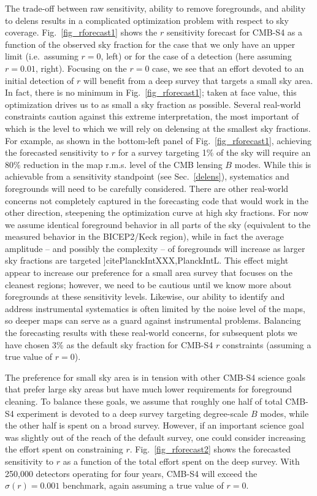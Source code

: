 The trade-off between raw sensitivity, ability to remove foregrounds, and ability to delens results in a complicated optimization problem with respect to sky coverage.
Fig.~\ref{fig_rforecast1} shows the $r$ sensitivity forecast for CMB-S4 as a function of the observed sky fraction for the case that we only have an upper limit (i.e.\ assuming $r=0$, left) or for the case of a detection (here assuming $r=0.01$, right).
Focusing on the $r=0$ case, we see that an effort devoted to an initial detection of $r$ will benefit from a deep survey that targets a small sky area.
In fact, there is no minimum in Fig.~\ref{fig_rforecast1}; taken at face value, this optimization drives us to as small a sky fraction as possible. 
Several real-world constraints caution against this extreme interpretation, the most important of which is the level to which we will rely on delensing at the smallest sky fractions.
For example, as shown in the bottom-left panel of Fig.~\ref{fig_rforecast1}, achieving the forecasted sensitivity to $r$ for a survey targeting 1\% of the sky will require an 80\% reduction in the map r.m.s. level of the CMB lensing $B$ modes. 
While this is achievable from a sensitivity standpoint (see Sec.~\ref{delens}), systematics and foregrounds will need to be carefully considered.
There are other real-world concerns not completely captured in the forecasting code that would work in the other direction, steepening the optimization curve at high sky fractions.
For now we assume identical foreground behavior in all parts of the sky (equivalent to the measured behavior in the BICEP2/Keck region), while in fact the average amplitude -- and possibly the complexity -- of foregrounds will increase as larger sky fractions are targeted ]cite{PlanckIntXXX,PlanckIntL}.
This effect might appear to increase our preference for a small area survey that focuses on the cleanest regions; however, we need to be cautious until we know more about foregrounds at these sensitivity levels.
Likewise, our ability to identify and address instrumental systematics is often limited by the noise level of the maps, so deeper maps can serve as a guard against instrumental problems.
Balancing the forecasting results with these real-world concerns, for subsequent plots we have chosen 3\% as the default sky fraction for CMB-S4 $r$ constraints (assuming a true value of $r=0$).

The preference for small sky area is in tension with other CMB-S4 science goals that prefer large sky areas but have much lower requirements for foreground cleaning.
To balance these goals, we assume that roughly one half of total CMB-S4 experiment is devoted to a deep survey targeting degree-scale $B$ modes, while the other half is spent on a broad survey.
However, if an important science goal was slightly out of the reach of the default survey, one could consider increasing the effort spent on constraining $r$.
Fig.~\ref{fig_rforecast2} shows the forecasted sensitivity to $r$ as a function of the total effort spent on the deep survey.
With 250,000 detectors operating for four years, CMB-S4 will exceed the $\sigma(r)=0.001$ benchmark, again assuming a true value of $r=0$.

